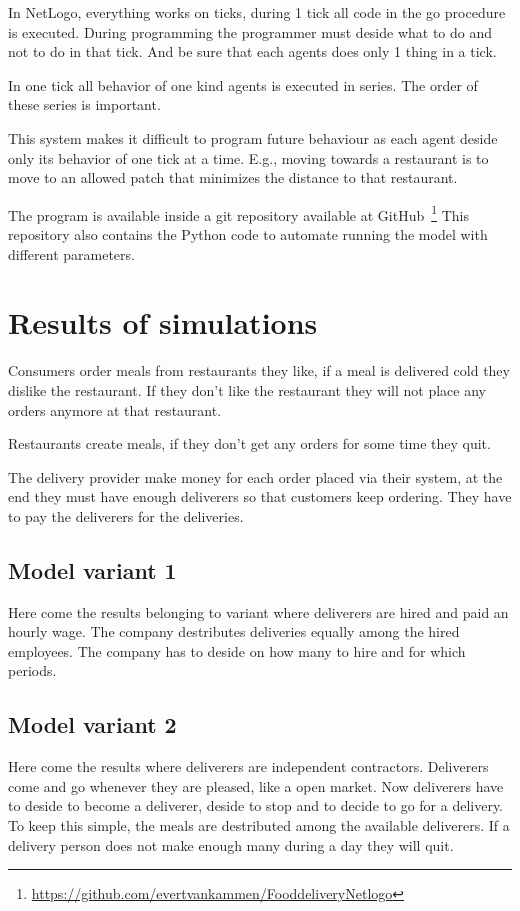 In NetLogo, everything works on ticks, during 1 tick all code in the go procedure is executed.
During programming the programmer must deside what to do and not to do in that tick.
And be sure that each agents does only 1 thing in a tick.

In one tick all behavior of one kind agents is executed in series.
The order of these series is important.

This system makes it difficult to program future behaviour as each agent deside only its behavior of one tick at a time.
E.g., moving towards a restaurant is to move to an allowed patch that minimizes the distance to that restaurant.

The program is available inside a git repository available at GitHub~\footnote{\url{https://github.com/evertvankammen/FooddeliveryNetlogo}}
This repository also contains the Python code to automate running the model with different parameters.

\section{Results of simulations}\label{sec:results-of-simulations}
Consumers order meals from restaurants they like, if a meal is delivered cold they dislike the restaurant.
If they don't like the restaurant they will not place any orders anymore at that restaurant.

Restaurants create meals, if they don't get any orders for some time they quit.

The delivery provider make money for each order placed via their system, at the end they must have enough deliverers so that
customers keep ordering.
They have to pay the deliverers for the deliveries.



\subsection{Model variant 1}
Here come the results belonging to variant where deliverers are hired and paid an hourly wage.
The company destributes deliveries equally among the hired employees.
The company has to deside on how many to hire and for which periods.


\subsection{Model variant 2}
Here come the results where deliverers are independent contractors.
Deliverers come and go whenever they are pleased, like a open market.
Now deliverers have to deside to become a deliverer, deside to stop and to decide to go for a delivery.
To keep this simple, the meals are destributed among the available deliverers.
If a delivery person does not make enough many during a day they will quit.
